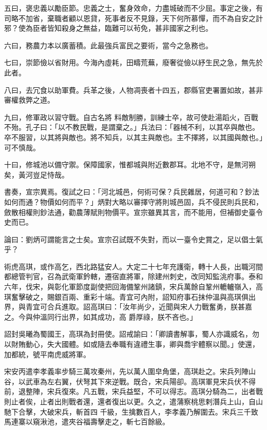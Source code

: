 \begin{pinyinscope}
 五曰，褒忠義以勵臣節。忠義之士，奮身效命，力盡城破而不少屈。事定之後，有司略不加省，棄職者顧以恩貸，死事者反不見錄，天下何所慕憚，而不為自安之計邪？使為臣者皆知殺身之無益，臨難可以茍免，甚非國家之利也。



 六曰，務農力本以廣蓄積。此最強兵富民之要術，當今之急務也。



 七曰，崇節儉以省財用。今海內虛耗，田疇荒蕪，廢奢從儉以紓生民之急，無先於此者。



 八曰，去冗食以助軍費。兵革之後，人物凋喪者十四五，郡縣官吏署置如故，甚非審權救弊之道。



 九曰，修軍政以習守戰。自古名將
 料敵制勝，訓練士卒，故可使赴湯蹈火，百戰不殆。孔子曰：「以不教民戰，是謂棄之。」兵法曰：「器械不利，以其卒與敵也。卒不服習，以其將與敵也。將不知兵，以其主與敵也。主不擇將，以其國與敵也。」可不慎哉。



 十曰，修城池以備守禦。保障國家，惟都城與附近數郡耳。北地不守，是無河朔矣，黃河豈足恃哉。



 書奏，宣宗異焉。復試之曰：「河北城邑，何術可保？兵民雜居，何道可和？鈔法如何而通？物價如何而平？」炳對大略以審擇守將則城邑固，兵不侵民則兵民和，斂散相權則鈔法通，勸農薄賦則物價平。宣宗雖異其言，而不能用，但補御史臺令史而已。



 論曰：劉炳可謂能言之士矣。宣宗召試既不失對，而以一臺令史賞之，足以倡士氣乎？



 術虎高琪，或作高乞，西北路猛安人。大定二十七年充護衛，轉十人長，出職河間都總管判官，召為武衛軍鈐轄，遷宿直將軍，除建州刺史，改同知監洮府事。泰和六年，伐宋，與彰化軍節度副使把回海備鞏州諸鎮，宋兵萬餘自鞏州轆轤嶺入，高琪奮擊破之，賜銀百兩、重彩十端。青宜可內附，詔知府事石抹仲溫與高琪俱出界，與青宜可合兵進取。詔高琪曰：「汝年尚少，近聞與宋人力戰奮勇，朕甚嘉之。今與仲溫同行出界，如其成功，高
 爵厚祿，朕不吝也。」



 詔封吳曦為蜀國王，高琪為封冊使。詔戒諭曰：「卿讀書解事，蜀人亦識威名，勿以財賄動心，失大國體。如或隨去奉職有違禮生事，卿與喬宇體察以聞。」使還，加都統，號平南虎威將軍。



 宋安丙遣李孝義率步騎三萬攻秦州，先以萬人圍皁角堡，高琪赴之。宋兵列陣山谷，以武車為左右翼，伏弩其下來逆戰。既合，宋兵陽卻。高琪軍見宋兵伏不得前，退整陣，宋兵復來。凡五戰，宋兵益堅，不可以得志。高琪分騎為二，出者戰則止者俟，止者出則戰者還，還者復出以更。久之，遣蒲察桃思剌潛兵上山，自山馳下合擊，大破宋兵，斬首四
 千級，生擒數百人，李孝義乃解圍去。宋兵三千致馬連寨以窺湫池，遣夾谷福壽擊走之，斬七百餘級。




\end{pinyinscope}
